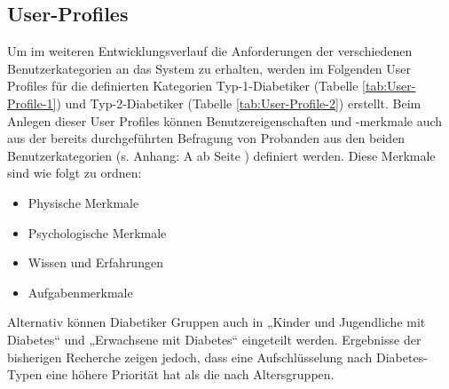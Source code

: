 	\subsection{User-Profiles}
	Um im weiteren Entwicklungsverlauf die Anforderungen der verschiedenen Benutzerkategorien an das System zu erhalten, werden im Folgenden User Profiles für die definierten Kategorien Typ-1-Diabetiker (Tabelle \ref{tab:User-Profile-1}) und Typ-2-Diabetiker (Tabelle \ref{tab:User-Profile-2}) erstellt. Beim Anlegen dieser User Profiles können Benutzereigenschaften und -merkmale auch aus der bereits durchgeführten Befragung von Probanden aus den beiden Benutzerkategorien (s. Anhang: A  ab Seite \pageref{section:Evaluation}) definiert werden. Diese Merkmale sind wie folgt zu ordnen:
	\begin{itemize}
		\item Physische Merkmale
		\item Psychologische Merkmale
		\item Wissen und Erfahrungen
		\item Aufgabenmerkmale
	\end{itemize}
	Alternativ können Diabetiker Gruppen auch in „Kinder und Jugendliche mit Diabetes“ und „Erwachsene mit Diabetes“ eingeteilt werden. Ergebnisse der bisherigen Recherche zeigen jedoch, dass eine Aufschlüsselung nach Diabetes-Typen eine höhere Priorität hat als die nach Altersgruppen. 
